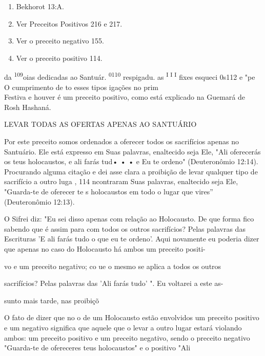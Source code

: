 \begin{itemize}
\begin{enumrate}
\begin{itemize}
\begin{itemize}
\begin{enumerate}
\def\labelenumi{\arabic{enumi}.}
\setcounter{enumi}{104}
\item
 
 Bekhorot 13:A.
 
\item
 
 Ver Preceitos Positivos 216 e 217.
 
\item
 
 Ver o preceito negativo 155.
 
\item
 
 Ver o preceito positivo 114.
 
\end{enumerate}




da \textsuperscript{109}oias dedicadas ao Santuár.
\textsuperscript{0110} respigadu. as
\textsuperscript{I I I} fixes esqueci 0s112 e "pe O cumprimento de to
esses tipos igações no prim\\
Festiva e houver é um preceito positivo, como está explicado na Guemará
de Rosh Hashaná.


LEVAR TODAS AS OFERTAS APENAS AO SANTUÁRIO


Por este preceito somos ordenados a oferecer todos os sacrifícios apenas
no Santuário. Ele está expresso em Suas palavras, enaltecido seja Ele,
"Ali oferecerás os teus holocaustos, e ali farás tud• • • e Eu te
ordeno" (Deu­teronômio 12:14). Procurando alguma citação e dei asse
clara a proibição de levar qualquer tipo de sacrifício a outro luga ,
114 ncontraram Suas pala­vras, enaltecido seja Ele, "Guarda-te de
oferecer te s holocaustos em todo o lugar que vires'' (Deuteronômio
12:13).

O Sifrei diz: "Eu sei disso apenas com relação ao Holocausto. De que
forma fico sabendo que é assim para com todos os outros sacrifícios?
Pelas pa­lavras das Escrituras 'E ali farás tudo o que eu te ordeno'.
Aqui novamente eu poderia dizer que apenas no caso do Holocausto há
ambos um preceito positi-

vo e um preceito negativo; co ue o mesmo se aplica a todos os outros

sacrifícios? Pelas palavras das 'Ali farás tudo' ". Eu voltarei a este
as-

sunto mais tarde, nas proibiçõ

O fato de dizer que no o de um Holocausto estão envolvidos um preceito
positivo e um negativo significa que aquele que o levar a outro lugar
estará violando ambos: um preceito positivo e um preceito negativo,
sendo o preceito negativo "Guarda-te de ofereceres teus holocaustos" e o
positivo "Ali


\end{itemize}
\end{itemize}
\end{enumrate}
\end{itemize}
